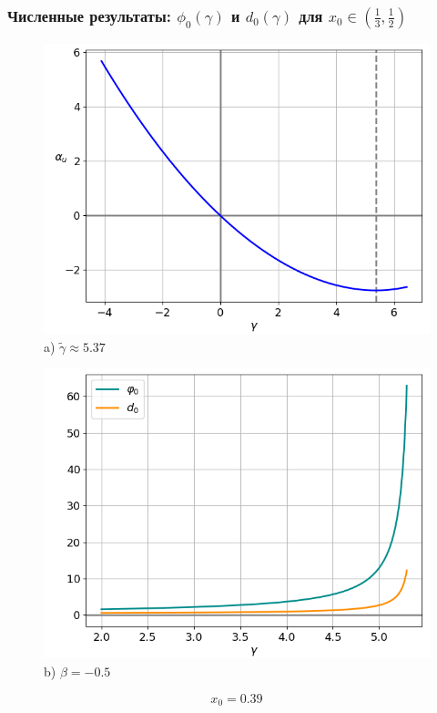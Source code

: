 \documentclass[fullscreen=true, unicode, bookmarks=false]{beamer}
\begin{document}
\begin{frame}
\frametitle{ Численные результаты: $ \phi_0(\gamma) $ и $ d_0(\gamma) $ для $ x_0 \in \left( \frac{1}{3}, \frac{1}{2} \right) $ }

\begin{figure} 
\begin{minipage}[h]{0.49\linewidth}
\begin{center}
\includegraphics[scale=0.38]{x0=0,39.png} \\ {\scriptsize a) $ \widetilde{\gamma} \approx 5.37 $}
\end{center}
\end{minipage} 
\hfill
\begin{minipage}[h]{0.49\linewidth}
\begin{center}
\includegraphics[scale=0.38]{divergent_phi0d0_x0=0,39,beta=0,5_before.png}  \\ {\scriptsize b) $ \beta = -0.5 $}
\end{center}
\end{minipage} 
\end{figure}

$$ x_0 = 0.39 $$

\end{frame}
\end{document}
